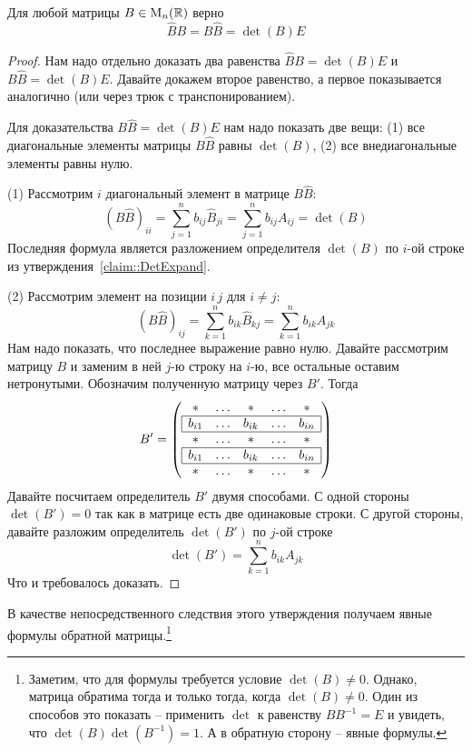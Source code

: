 \begin{claim}\label{claim::InvMatExplicite}
Для любой матрицы $B\in \operatorname{M}_{n}(\mathbb R)$ верно 
\[
\hat B B = B\hat B = \det(B) E
\]
\end{claim}
\begin{proof}
Нам надо отдельно доказать два равенства $\hat B B = \det (B) E$ и $B\hat B = \det (B) E$. Давайте докажем второе равенство, а первое показывается аналогично (или через трюк с транспонированием).

Для доказательства $B\hat B = \det (B) E$ нам надо показать две вещи: (1) все диагональные элементы матрицы $B\hat B$ равны $\det (B)$, (2) все внедиагональные элементы равны нулю.

(1) Рассмотрим $i$ диагональный элемент в матрице $B\hat B$:
\[
(B\hat B)_{ii} = \sum_{j=1}^n b_{ij}\hat B_{ji} = \sum_{j=1}^n b_{ij}A_{ij}=\det(B)
\]
Последняя формула является разложением определителя $\det (B)$ по $i$-ой строке из утверждения~\ref{claim::DetExpand}.

(2) Рассмотрим элемент на позиции $i\,j$ для $i\neq j$:
\[
(B\hat B)_{ij} = \sum_{k=1}^n b_{ik}\hat B_{kj} = \sum_{k=1}^n b_{ik}A_{jk}
\]
Нам надо показать, что последнее выражение равно нулю. Давайте рассмотрим матрицу $B$ и заменим в ней $j$-ю строку на $i$-ю, все остальные оставим нетронутыми. Обозначим полученную матрицу через $B'$. Тогда
\[
B' =
\left(
\begin{array}{ccccc}
{*}&{\ldots}&{*}&{\ldots}&{*}\\
\hline
\multicolumn{1}{|c}{b_{i1}}&{\ldots}&{b_{ik}}&{\ldots}&\multicolumn{1}{c|}{b_{in}}\\
\hline
{*}&{\ldots}&{*}&{\ldots}&{*}\\
\hline
\multicolumn{1}{|c}{b_{i1}}&{\ldots}&{b_{ik}}&{\ldots}&\multicolumn{1}{c|}{b_{in}}\\
\hline
{*}&{\ldots}&{*}&{\ldots}&{*}\\
\end{array}
\right)
\]
Давайте посчитаем определитель $B'$ двумя способами. С одной стороны $\det(B') = 0$ так как в матрице есть две одинаковые строки. С другой стороны, давайте разложим определитель $\det(B')$ по $j$-ой строке
\[
\det (B') = \sum_{k=1}^n b_{ik}A_{jk}
\]
Что и требовалось доказать.
\end{proof}

В качестве непосредственного следствия этого утверждения получаем явные формулы обратной матрицы.\footnote{Заметим, что для формулы требуется условие $\det (B)\neq 0$. Однако, матрица обратима тогда и только тогда, когда $\det(B)\neq 0$. Один из способов это показать -- применить $\det$ к равенству $B B^{-1} = E$ и увидеть, что $\det(B) \det(B^{-1}) = 1$. А в обратную сторону -- явные формулы.}

